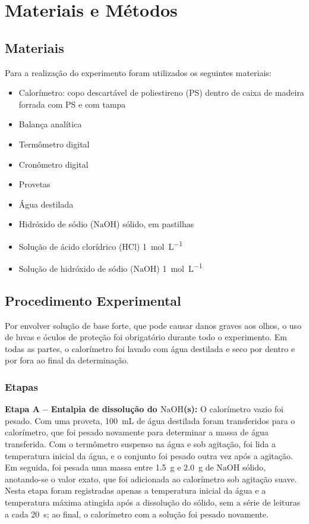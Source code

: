 \section{Materiais e Métodos}
 \subsection{Materiais}
 Para a realização do experimento foram utilizados os seguintes materiais:
 \begin{itemize}
    \item Calorímetro: copo descartável de poliestireno (PS) dentro de caixa de madeira forrada com PS e com tampa
    \item Balança analítica
    \item Termômetro digital
    \item Cronômetro digital
    \item Provetas
    \item Água destilada
    \item Hidróxido de sódio ($\mathrm{NaOH}$) sólido, em pastilhas
    \item Solução de ácido clorídrico ($\mathrm{HCl}$) \SI{1}{mol.L^{-1}}
    \item Solução de hidróxido de sódio ($\mathrm{NaOH}$) \SI{1}{mol.L^{-1}}
\end{itemize}

 \subsection{Procedimento Experimental}
 Por envolver solução de base forte, que pode causar danos graves aos olhos, o uso de luvas e óculos de proteção foi obrigatório durante todo o experimento. Em todas as partes, o calorímetro foi lavado com água destilada e seco por dentro e por fora ao final da determinação.

 \subsubsection{Etapas}
    \textbf{Etapa A -- Entalpia de dissolução do $\mathrm{NaOH}$(s):}
    O calorímetro vazio foi pesado. Com uma proveta, \SI{100}{mL} de água destilada foram transferidos para o calorímetro, que foi pesado novamente para determinar a massa de água transferida. Com o termômetro suspenso na água e sob agitação, foi lida a temperatura inicial da água, e o conjunto foi pesado outra vez após a agitação. Em seguida, foi pesada uma massa entre \SI{1,5}{g} e \SI{2,0}{g} de $\mathrm{NaOH}$ sólido, anotando-se o valor exato, que foi adicionada ao calorímetro sob agitação suave. Nesta etapa foram registradas apenas a temperatura inicial da água e a temperatura máxima atingida após a dissolução do sólido, sem a série de leituras a cada \SI{20}{s}; ao final, o calorímetro com a solução foi pesado novamente.

